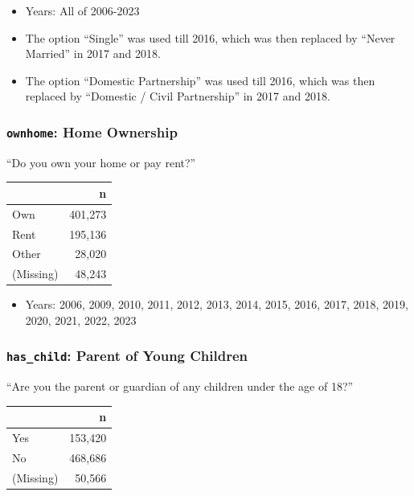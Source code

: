 \documentclass[10pt,article,oneside]{memoir}
\theoremstyle{definition}
\begin{document}
\begin{itemize}
\tightlist
\item
  Years: All of 2006-2023
\item
  The option ``Single'' was used till 2016, which was then replaced by
  ``Never Married'' in 2017 and 2018.
\item
  The option ``Domestic Partnership'' was used till 2016, which was then
  replaced by ``Domestic / Civil Partnership'' in 2017 and 2018.
\end{itemize}

\subsubsection{\texorpdfstring{\texttt{ownhome}: Home
Ownership}{ownhome: Home Ownership}}\label{ownhome-home-ownership}

``Do you own your home or pay rent?''

\begin{table}[H]
\centering
\begin{tabular}[t]{lr}
\toprule
 & n\\
\midrule
Own & 401,273\\
Rent & 195,136\\
Other & 28,020\\
(Missing) & 48,243\\
\bottomrule
\end{tabular}
\end{table}

\begin{itemize}
\tightlist
\item
  Years: 2006, 2009, 2010, 2011, 2012, 2013, 2014, 2015, 2016, 2017,
  2018, 2019, 2020, 2021, 2022, 2023
\end{itemize}

\subsubsection{\texorpdfstring{\texttt{has\_child}: Parent of Young
Children}{has\_child: Parent of Young Children}}\label{has_child-parent-of-young-children}

``Are you the parent or guardian of any children under the age of 18?''

\begin{table}[H]
\centering
\begin{tabular}[t]{lr}
\toprule
 & n\\
\midrule
Yes & 153,420\\
No & 468,686\\
(Missing) & 50,566\\
\bottomrule
\end{tabular}
\end{table}
\end{document}
